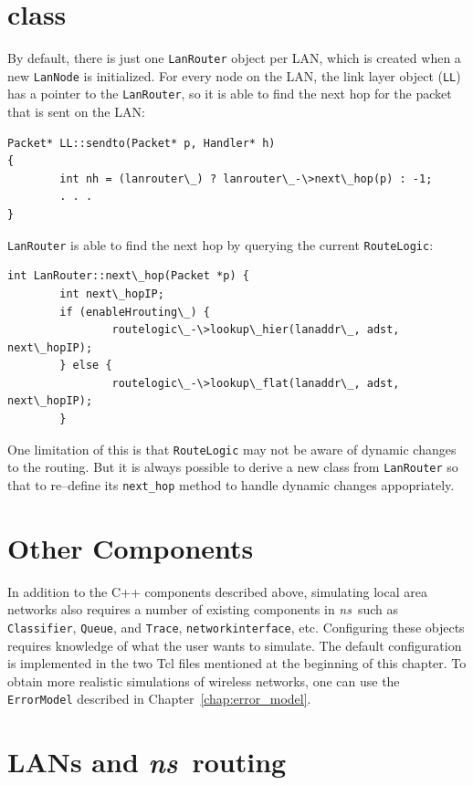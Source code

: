 \section{ class}
By default, there is just one {\tt LanRouter} object per LAN, which
is created when a new {\tt LanNode} is initialized.  For every node
on the LAN, the link layer object ({\tt LL}) has a pointer to the
{\tt LanRouter}, so it is able to find the next hop for the packet
that is sent on the LAN:
\begin{verbatim}
Packet* LL::sendto(Packet* p, Handler* h)
{        
        int nh = (lanrouter\_) ? lanrouter\_-\>next\_hop(p) : -1;
        . . .
}
\end{verbatim}
{\tt LanRouter} is able to find the next hop by querying the current
{\tt RouteLogic}:
\begin{verbatim}
int LanRouter::next\_hop(Packet *p) {
        int next\_hopIP;
        if (enableHrouting\_) {
                routelogic\_-\>lookup\_hier(lanaddr\_, adst, next\_hopIP);
        } else {
                routelogic\_-\>lookup\_flat(lanaddr\_, adst, next\_hopIP);
        }
\end{verbatim}
One limitation of this is that {\tt RouteLogic} may not be aware of
dynamic changes to the routing.  But it is always possible to derive a
new class from {\tt LanRouter} so that to re--define its
{\tt next\_hop} method to handle dynamic changes appopriately.

\section{Other Components}
\label{sec:lan_others}

In addition to the C++ components described above, simulating local area
networks also requires a number of existing components in \emph{ns}\ such as
{\tt Classifier}, {\tt Queue}, and {\tt Trace},
{\tt networkinterface}, etc.  Configuring these
objects requires knowledge of what the user wants to simulate.  The
default configuration is implemented in the two Tcl files mentioned at
the beginning of this chapter.  To obtain more realistic simulations
of wireless networks, one can use the {\tt ErrorModel} described in
Chapter~\ref{chap:error_model}.

\section{LANs and \emph{ns}\ routing}
\label{sec:lan_ns-routing}

